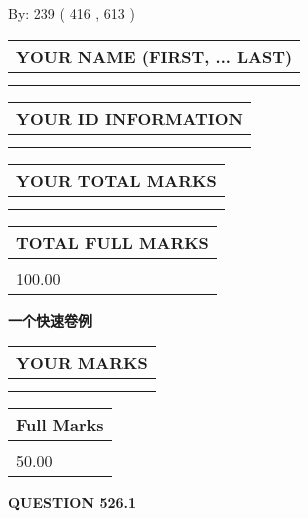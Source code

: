\documentclass{ctexart}
\begin{document}
   
\hspace{1.0in} By: 
 239 ( 416 ,  613 )
   
   
   
   
\newpage 
\setcounter{page}{ 
   526001 } 
   
   
   
   
\noindent\begin{tabular}{|l|}
\hline
YOUR NAME (FIRST, ... LAST)  \\
\hline
 \\ 
 \\ 
\hline
\end{tabular}
\hspace{0.05in} \begin{tabular}{|l|}
\hline
 YOUR   ID   INFORMATION  \\
\hline
 \\ 
 \\ 
\hline
\end{tabular}
   
   
\vspace{0.2in}\noindent\begin{tabular}{|l|}
\hline
YOUR TOTAL MARKS  \\
\hline
 \\ 
 \\ 
\hline
\end{tabular}
\hspace{0.05in} \begin{tabular}{|l|}
\hline
TOTAL FULL MARKS  \\
\hline
 \\ 
100.00 \\
\hline
\end{tabular}
   
   
 \vspace{0.2in}
{\LARGE {\textbf{ 一个快速卷例}}}
   
   
  
\vspace{0.2in}
  
\noindent\begin{tabular}{|l|}
\hline
 YOUR MARKS  \\
\hline
 \\ 
 \\ 
\hline
\end{tabular}
\hspace{0.05in} \begin{tabular}{|l|}
\hline
 Full Marks  \\
\hline
 \\ 
50.00 \\
\hline
\end{tabular}
{\textbf{\Large{QUESTION
526.1 
}}}
  
\end{document}
